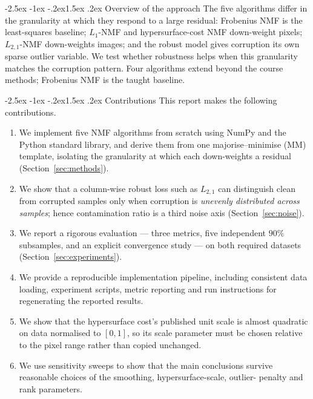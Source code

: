\documentclass[12pt,a4paper]{article}
\makeatletter
\renewcommand\subsection{\@startsection{subsection}{2}{\z@}%
    {-2.5ex \@plus -1ex \@minus -.2ex}{1.5ex \@plus.2ex}%
    {\normalfont\fontsize{12}{14}\bfseries}}
\makeatother
\begin{document}
\subsection{Overview of the approach}
The five algorithms differ in the granularity at which they respond to a large
residual: Frobenius NMF is the least-squares baseline; $L_1$-NMF and
hypersurface-cost NMF down-weight pixels; $L_{2,1}$-NMF down-weights images;
and the robust model gives corruption its own sparse outlier variable. We test
whether robustness helps when this granularity matches the corruption pattern.
Four algorithms extend beyond the course methods; Frobenius NMF is the taught
baseline.

\subsection{Contributions}
This report makes the following contributions.
\begin{enumerate}\itemsep0pt
  \item We implement five NMF algorithms from scratch using NumPy and the
        Python standard library, and derive them from one majorise--minimise
        (MM) template, isolating the granularity at which each down-weights a
        residual (Section~\ref{sec:methods}).
  \item We show that a column-wise robust loss such as $L_{2,1}$ can
        distinguish clean from corrupted samples only when corruption is
        \emph{unevenly distributed across samples}; hence contamination ratio
        is a third noise axis (Section~\ref{sec:noise}).
  \item We report a rigorous evaluation --- three metrics, five independent
        $90\%$ subsamples, and an explicit convergence study --- on both
        required datasets (Section~\ref{sec:experiments}).
  \item We provide a reproducible implementation pipeline, including consistent
        data loading, experiment scripts, metric reporting and run instructions
        for regenerating the reported results.
  \item We show that the hypersurface cost's published unit scale is almost
        quadratic on data normalised to $[0,1]$, so its scale parameter must be
        chosen relative to the pixel range rather than copied unchanged.
  \item We use sensitivity sweeps to show that the main conclusions survive
        reasonable choices of the smoothing, hypersurface-scale, outlier-
        penalty and rank parameters.
\end{enumerate}
\end{document}
